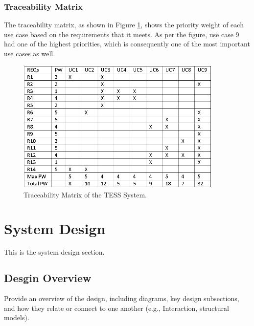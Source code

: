 \documentclass{article}
\begin{document}
\subsubsection{Traceability Matrix}
The traceability matrix, as shown in Figure \ref{fig:traceabilitymatrix}, shows the priority weight of each use case based on the requirements that it meets. As per the figure, use case 9 had one of the highest priorities, which is consequently one of the most important use cases as well.
\begin{figure}[ht]\centering
\includegraphics[width=4.0in]{./Figure/Traceability_Matrix.PNG}
\caption{Traceability Matrix of the TESS System.}\label{fig:traceabilitymatrix}
\end{figure}

\section{System Design}
This is the system design section.

\subsection{Desgin Overview}
Provide an overview of the design, including diagrams, key design subsections, and how they relate or connect to one another (e.g., Interaction, structural models).
\end{document}
